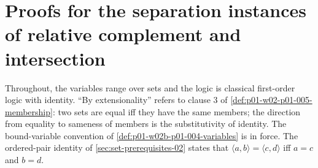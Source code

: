 \section{Proofs for the separation instances of relative complement and intersection}
\label{sec:annex-p01-w02b-p01-004-separation-instances}

Throughout, the variables range over sets and the logic is classical
first-order logic with identity. ``By extensionality'' refers to clause 3 of
\cref{def:p01-w02-p01-005-membership}: two sets are equal iff they have the
same members; the direction from equality to sameness of members is the
substitutivity of identity. The bound-variable convention of
\cref{def:p01-w02b-p01-004-variables} is in force. The ordered-pair identity
of \cref{sec:set-prerequisites-02} states that
\(\langle a,b\rangle=\langle c,d\rangle\) iff \(a=c\) and \(b=d\).

